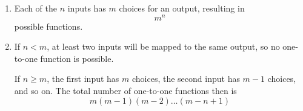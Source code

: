 \begin{enumerate}[label=(\alph*)]
\item   Each of the $n$ inputs has $m$ choices for an output, resulting in 
$$m^{n}$$ possible functions.

\item   If $n < m$, at least two inputs will be mapped to the same output, 
so no one-to-one function is possible. 
  
  If $n \geq m$, the first input has $m$ choices, the second input has $m - 1$ 
  choices, and so on. The total number of one-to-one functions then is 
  $$m(m-1)(m-2)\dots(m-n+1)$$
\end{enumerate}